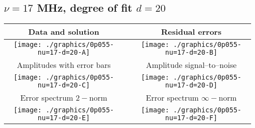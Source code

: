 

% 

\clearpage{}
\break{}

\subsection{$\nu = 17$ MHz, degree of fit $d = 20$}

\begin{table}[h]
    \begin{center}
        \begin{tabular}{ccc}
            Data and solution & \quad & Residual errors \\\hline
            \texttt{[image: ./graphics/0p055-nu=17-d=20-A]} &&
            \texttt{[image: ./graphics/0p055-nu=17-d=20-B]} \\[15pt]
            Amplitudes with error bars && Amplitude signal--to--noise \\\hline
            \texttt{[image: ./graphics/0p055-nu=17-d=20-C]} &&
            \texttt{[image: ./graphics/0p055-nu=17-d=20-D]} \\[15pt]
            Error spectrum $2-$norm && Error spectrum $\infty-$norm \\\hline
            \texttt{[image: ./graphics/0p055-nu=17-d=20-E]} &&
            \texttt{[image: ./graphics/0p055-nu=17-d=20-F]} \\[15pt]
        \end{tabular}
    \end{center}
\label{fig:elev=55, nu=17}
\end{table}



\endinput
